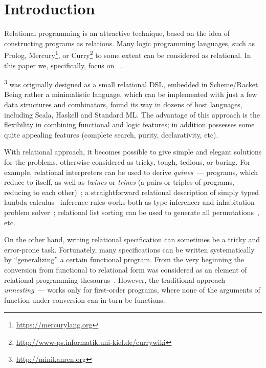 \section{Introduction}
\label{intro}

Relational programming is an attractive technique, based on the idea of constructing programs as relations.
Many logic programming languages, such as Prolog, Mercury\footnote{\url{https://mercurylang.org}}, 
or Curry\footnote{\url{http://www-ps.informatik.uni-kiel.de/currywiki}} to some extent can be considered as relational. 
In this paper we, specifically, focus on \miniKanren~\cite{TRS}. 

\miniKanren\footnote{\url{http://minikanren.org}} was originally designed as a small relational DSL, embedded in Scheme/Racket. 
Being rather a minimalistic language, which can be implemented with just a few data structures and combinators, \miniKanren found 
its way in dozens of host languages, including Scala, Haskell and Standard ML. The advantage of this approach is the flexibility in
combining functional and logic features; in addition \miniKanren possesses some quite appealing features (complete search, purity, 
declarativity, etc).

With relational approach, it becomes possible to give simple and elegant solutions for the problems, otherwise
considered as tricky, tough, tedious, or boring. For example, relational interpreters can be used to derive
\emph{quines}~--- programs, which reduce to itself, as well as \emph{twines} or \emph{trines} (a pairs or triples of
programs, reducing to each other)~\cite{Untagged}; a straightforward relational description of
simply typed lambda calculus~\cite{Lambda} inference rules works both as type inferencer and inhabitation problem solver~\cite{WillThesis};
relational list sorting can be used to generate all permutations~\cite{ocanren}, etc. 

On the other hand, writing relational specification can sometimes be a tricky and error-prone task. Fortunately, many 
specifications can be written systematically by ``generalizing'' a certain functional program. From the very beginning 
the conversion from functional to relational form was considered as an element of relational programming thesaurus~\cite{TRS}. However,
the traditional approach~--- \emph{unnesting}~--- works only for first-order programs, where none of the arguments of
function under conversion can in turn be functions.

